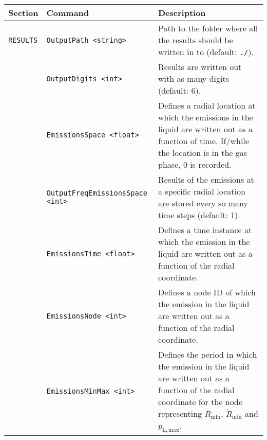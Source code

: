 \noindent
\begin{tabular}{p{} p{} p{}}
    \textbf{Section} &\textbf{Command} & \textbf{Description} 
\vspace{1mm} \\ \hline
{\tt RESULTS} & {\tt OutputPath <string>} & Path to the folder where all the results should be written in to (default: {\tt ./}).\\
& {\tt OutputDigits <int>} & Results are written out with as many digits (default: 6).\\
& {\tt EmissionsSpace <float>} & Defines a radial location at which the emissions in the liquid are written out as a function of time. If/while the location is in the gas phase, $0$ is recorded.\\ 
& {\tt OutputFreqEmissionsSpace <int>} & Results of the emissions at a specific radial location are stored every so many time steps (default: 1).\\ 
& {\tt EmissionsTime <float>} & Defines a time instance at which the emission in the liquid are written out as a function of the radial coordinate.\\ 
& {\tt EmissionsNode <int>} & Defines a node ID of which the emission in the liquid are written out as a function of the radial coordinate.\\ 
& {\tt EmissionsMinMax <int>} & Defines the period in which the emission in the liquid are written out as a function of the radial coordinate for the node representing $R_\mathrm{min}$, $\dot{R}_\mathrm{min}$ and $p_\mathrm{L,max}$.\\ 
 \hline
\end{tabular} \vspace{1em}
